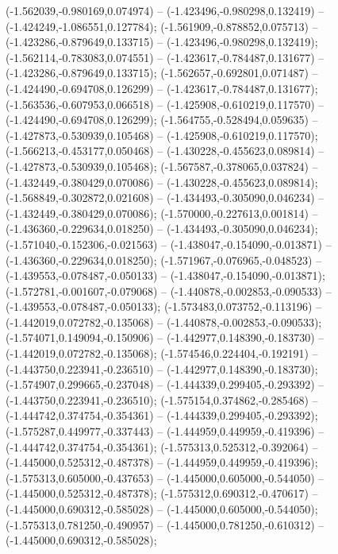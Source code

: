  (-1.562039,-0.980169,0.074974) -- (-1.423496,-0.980298,0.132419) -- (-1.424249,-1.086551,0.127784);
 (-1.561909,-0.878852,0.075713) -- (-1.423286,-0.879649,0.133715) -- (-1.423496,-0.980298,0.132419);
 (-1.562114,-0.783083,0.074551) -- (-1.423617,-0.784487,0.131677) -- (-1.423286,-0.879649,0.133715);
 (-1.562657,-0.692801,0.071487) -- (-1.424490,-0.694708,0.126299) -- (-1.423617,-0.784487,0.131677);
 (-1.563536,-0.607953,0.066518) -- (-1.425908,-0.610219,0.117570) -- (-1.424490,-0.694708,0.126299);
 (-1.564755,-0.528494,0.059635) -- (-1.427873,-0.530939,0.105468) -- (-1.425908,-0.610219,0.117570);
 (-1.566213,-0.453177,0.050468) -- (-1.430228,-0.455623,0.089814) -- (-1.427873,-0.530939,0.105468);
 (-1.567587,-0.378065,0.037824) -- (-1.432449,-0.380429,0.070086) -- (-1.430228,-0.455623,0.089814);
 (-1.568849,-0.302872,0.021608) -- (-1.434493,-0.305090,0.046234) -- (-1.432449,-0.380429,0.070086);
 (-1.570000,-0.227613,0.001814) -- (-1.436360,-0.229634,0.018250) -- (-1.434493,-0.305090,0.046234);
 (-1.571040,-0.152306,-0.021563) -- (-1.438047,-0.154090,-0.013871) -- (-1.436360,-0.229634,0.018250);
 (-1.571967,-0.076965,-0.048523) -- (-1.439553,-0.078487,-0.050133) -- (-1.438047,-0.154090,-0.013871);
 (-1.572781,-0.001607,-0.079068) -- (-1.440878,-0.002853,-0.090533) -- (-1.439553,-0.078487,-0.050133);
 (-1.573483,0.073752,-0.113196) -- (-1.442019,0.072782,-0.135068) -- (-1.440878,-0.002853,-0.090533);
 (-1.574071,0.149094,-0.150906) -- (-1.442977,0.148390,-0.183730) -- (-1.442019,0.072782,-0.135068);
 (-1.574546,0.224404,-0.192191) -- (-1.443750,0.223941,-0.236510) -- (-1.442977,0.148390,-0.183730);
 (-1.574907,0.299665,-0.237048) -- (-1.444339,0.299405,-0.293392) -- (-1.443750,0.223941,-0.236510);
 (-1.575154,0.374862,-0.285468) -- (-1.444742,0.374754,-0.354361) -- (-1.444339,0.299405,-0.293392);
 (-1.575287,0.449977,-0.337443) -- (-1.444959,0.449959,-0.419396) -- (-1.444742,0.374754,-0.354361);
 (-1.575313,0.525312,-0.392064) -- (-1.445000,0.525312,-0.487378) -- (-1.444959,0.449959,-0.419396);
 (-1.575313,0.605000,-0.437653) -- (-1.445000,0.605000,-0.544050) -- (-1.445000,0.525312,-0.487378);
 (-1.575312,0.690312,-0.470617) -- (-1.445000,0.690312,-0.585028) -- (-1.445000,0.605000,-0.544050);
 (-1.575313,0.781250,-0.490957) -- (-1.445000,0.781250,-0.610312) -- (-1.445000,0.690312,-0.585028);
